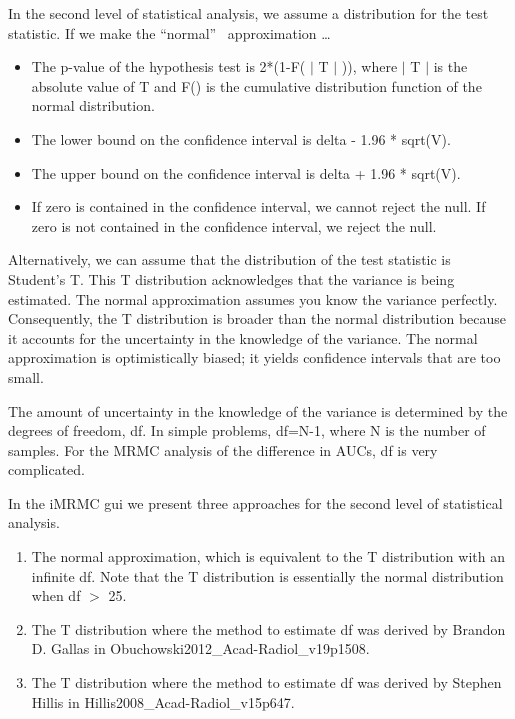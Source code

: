 \documentclass{article}%
\begin{document}
In the second level of statistical analysis, we assume a distribution for the
test statistic. If we make the \textquotedblleft normal\textquotedblright%
\ approximation \ldots

\begin{itemize}
\item The p-value of the hypothesis test is 2*(1-F(
$\vert$%
T%
$\vert$
)), where
$\vert$%
T%
$\vert$
is the absolute value of T and F() is the cumulative distribution function of
the normal distribution.

\item The lower bound on the confidence interval is delta - 1.96 * sqrt(V).

\item The upper bound on the confidence interval is delta + 1.96 * sqrt(V).

\item If zero is contained in the confidence interval, we cannot reject the
null. If zero is not contained in the confidence interval, we reject the null.
\end{itemize}

Alternatively, we can assume that the distribution of the test statistic is
Student's T. This T distribution acknowledges that the variance is being
estimated. The normal approximation assumes you know the variance perfectly.
Consequently, the T distribution is broader than the normal distribution
because it accounts for the uncertainty in the knowledge of the variance. The
normal approximation is optimistically biased; it yields confidence intervals
that are too small.

The amount of uncertainty in the knowledge of the variance is determined by
the degrees of freedom, df. In simple problems, df=N-1, where N is the number
of samples. For the MRMC analysis of the difference in AUCs, df is very complicated.

In the iMRMC gui we present three approaches for the second level of
statistical analysis.

\begin{enumerate}
\item The normal approximation, which is equivalent to the T distribution with
an infinite df. Note that the T distribution is essentially the normal
distribution when df
$>$
25.

\item The T distribution where the method to estimate df was derived by
Brandon D. Gallas in Obuchowski2012\_Acad-Radiol\_v19p1508.

\item The T distribution where the method to estimate df was derived by
Stephen Hillis in Hillis2008\_Acad-Radiol\_v15p647.
\end{enumerate}
\end{document}

